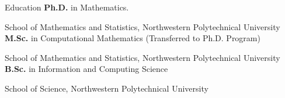 \begin{rubric}{Education}
\entry*[2019 -- 2025]%
	\textbf{Ph.D. } in Mathematics.
	\par School of Mathematics and Statistics, Northwestern Polytechnical University
%
\entry*[2018 -- 2019]%
	\textbf{M.Sc.} in Computational Mathematics (Transferred to Ph.D. Program) 
	\par School of Mathematics and Statistics, Northwestern Polytechnical University
\entry*[2014 -- 2018]%
	\textbf{B.Sc.} in Information and Computing Science
	\par School of Science, Northwestern Polytechnical University
	
\end{rubric}